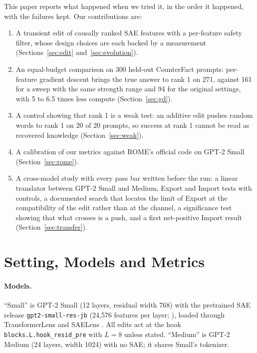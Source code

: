 \documentclass[11pt,twocolumn]{article}
\begin{document}
This paper reports what happened when we tried it, in the order it happened, with the failures kept. Our contributions are:
\begin{enumerate}
\item A transient edit of causally ranked SAE features with a per-feature safety filter, whose design choices are each backed by a measurement (Sections~\ref{sec:edit} and~\ref{sec:evolution}).
\item An equal-budget comparison on 300 held-out CounterFact prompts: per-feature gradient descent brings the true answer to rank 1 on 271, against 161 for a sweep with the same strength range and 94 for the original settings, with 5 to 6.5 times less compute (Section~\ref{sec:gd}).
\item A control showing that rank 1 is a weak test: an additive edit pushes random words to rank 1 on 20 of 20 prompts, so success at rank 1 cannot be read as recovered knowledge (Section~\ref{sec:weak}).
\item A calibration of our metrics against ROME's official code on GPT-2 Small (Section~\ref{sec:rome}).
\item A cross-model study with every pass bar written before the run: a linear translator between GPT-2 Small and Medium, Export and Import tests with controls, a documented search that locates the limit of Export at the compatibility of the edit rather than at the channel, a significance test showing that what crosses is a push, and a first net-positive Import result (Section~\ref{sec:transfer}).
\end{enumerate}

\section{Setting, Models and Metrics}
\label{sec:setting}

\paragraph{Models.} ``Small'' is GPT-2 Small (12 layers, residual width 768) with the pretrained SAE release \texttt{gpt2-small-res-jb} (24,576 features per layer; \citealp{bloom2024gpt2}), loaded through TransformerLens and SAELens \citep{nanda2022,bloom2024saelens}. All edits act at the hook \texttt{blocks.L.hook\_resid\_pre} with $L=8$ unless stated. ``Medium'' is GPT-2 Medium (24 layers, width 1024) with no SAE; it shares Small's tokenizer.
\end{document}
